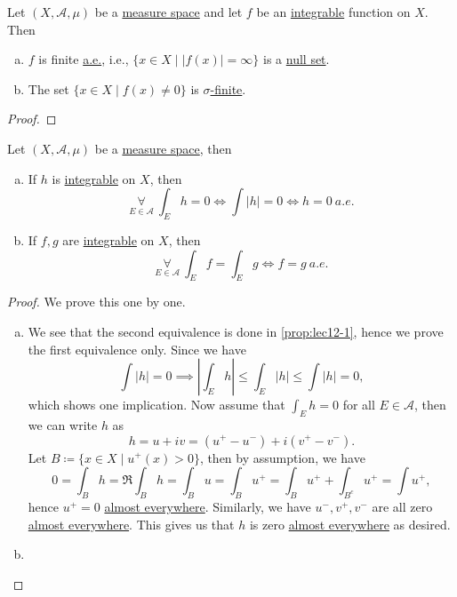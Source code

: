 \begin{lemma}\label{lma:lec-13-2}
	Let \((X, \mathcal{A} , \mu )\) be a \hyperref[def:measure-space]{measure space} and let \(f\) be an \hyperref[def:integrable]{integrable} function on \(X\).
	Then
	\begin{enumerate}[(a)]
		\item \(f\) is finite \hyperref[def:mu-almost-everywhere]{a.e.}, i.e., \(\{x\in X \mid \left\vert f(x) \right\vert = \infty \}\) is a \hyperref[def:mu-null-set]{null set}.
		\item The set \(\{x\in X \mid f(x)\neq 0\}\) is \hyperref[def:finite-measure]{\(\sigma \)-finite}.
	\end{enumerate}
\end{lemma}
\begin{proof}
\end{proof}

\begin{proposition}\label{prop:lec-13}
	Let \((X, \mathcal{A} , \mu )\) be a \hyperref[def:measure-space]{measure space}, then
	\begin{enumerate}[(a)]
		\item If \(h\) is \hyperref[def:integrable]{integrable} on \(X\), then
		      \[
			      \underset{E\in \mathcal{A} }{\forall }\ \int_E h = 0 \iff \int \left\vert h \right\vert = 0 \iff h = 0\ \hyperref[def:mu-almost-everywhere]{a.e.}
		      \]
		\item If \(f, g\) are \hyperref[def:integrable]{integrable} on \(X\), then
		      \[
			      \underset{E\in \mathcal{A} }{\forall }\ \int _E f = \int _E g \iff f = g\ \hyperref[def:mu-almost-everywhere]{a.e.}
		      \]
	\end{enumerate}
\end{proposition}
\begin{proof}
	We prove this one by one.
	\begin{enumerate}[(a)]
		\item We see that the second equivalence is done in \autoref{prop:lec12-1}, hence we prove the first equivalence only.
		      Since we have
		      \[
			      \int \left\vert h \right\vert = 0 \implies \left\vert \int _E h \right\vert \leq \int _E \left\vert h \right\vert \leq \int \left\vert h \right\vert = 0,
		      \]
		      which shows one implication. Now assume that \(\int _E h = 0\) for all \(E\in \mathcal{A} \), then we can write \(h\) as
		      \[
			      h = u + iv = (u^+ - u^-) + i (v^+ - v^-).
		      \]
		      Let \(B\coloneqq \{x\in X \mid u^+(x)>0\}\), then by assumption, we have
		      \[
			      0 = \int _B h = \Re \int _B h = \int _B u = \int _B u^+ = \int _B u^+ + \int _{B^{c}} u^+ = \int u^+,
		      \]
		      hence \(u^+ = 0\) \hyperref[def:mu-almost-everywhere]{almost everywhere}. Similarly, we have \(u^-, v^+, v^-\) are all zero \hyperref[def:mu-almost-everywhere]{almost everywhere}.
		      This gives us that \(h\) is zero  \hyperref[def:mu-almost-everywhere]{almost everywhere} as desired.
		\item {}
	\end{enumerate}
\end{proof}


